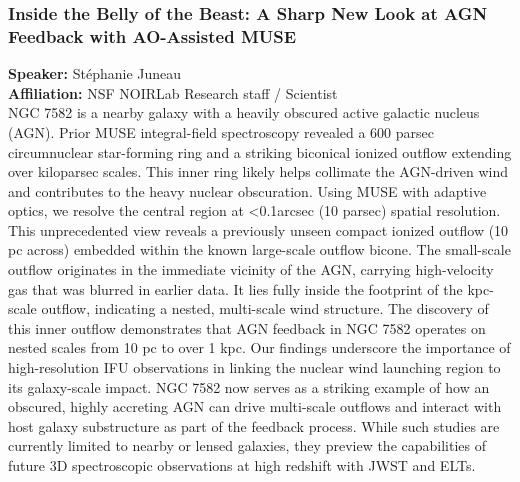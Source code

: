 \subsubsection*{Inside the Belly of the Beast: A Sharp New Look at AGN Feedback with AO-Assisted MUSE}
\textbf{Speaker:} Stéphanie Juneau \\
\textbf{Affiliation:} NSF NOIRLab \textperiodcentered{} Research staff / Scientist\\
NGC 7582 is a nearby galaxy with a heavily obscured active galactic nucleus (AGN). Prior MUSE integral-field spectroscopy revealed a 600 parsec circumnuclear star-forming ring and a striking biconical ionized outflow extending over kiloparsec scales. This inner ring likely helps collimate the AGN-driven wind and contributes to the heavy nuclear obscuration. Using MUSE with adaptive optics, we resolve the central region at <0.1arcsec (10 parsec) spatial resolution. This unprecedented view reveals a previously unseen compact ionized outflow (10 pc across) embedded within the known large-scale outflow bicone. The small-scale outflow originates in the immediate vicinity of the AGN, carrying high-velocity gas that was blurred in earlier data. It lies fully inside the footprint of the kpc-scale outflow, indicating a nested, multi-scale wind structure. The discovery of this inner outflow demonstrates that AGN feedback in NGC 7582 operates on nested scales from 10 pc to over 1 kpc. Our findings underscore the importance of high-resolution IFU observations in linking the nuclear wind launching region to its galaxy-scale impact. NGC 7582 now serves as a striking example of how an obscured, highly accreting AGN can drive multi-scale outflows and interact with host galaxy substructure as part of the feedback process. While such studies are currently limited to nearby or lensed galaxies, they preview the capabilities of future 3D spectroscopic observations at high redshift with JWST and ELTs.

\hypertarget{abs-38}{}
